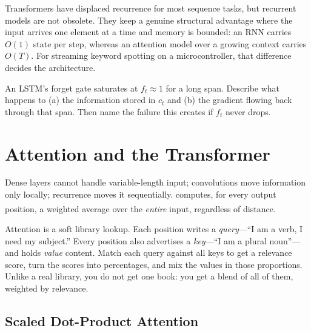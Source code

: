 \begin{engineernote}
Transformers have displaced recurrence for most sequence tasks, but recurrent
models are not obsolete. They keep a genuine structural advantage where the
input arrives one element at a time and memory is bounded: an RNN carries
$O(1)$ state per step, whereas an attention model over a growing context carries
$O(T)$. For streaming keyword spotting on a microcontroller, that difference
decides the architecture.
\end{engineernote}

\begin{checkpoint}
An LSTM's forget gate saturates at $f_t \approx 1$ for a long span. Describe
what happens to (a) the information stored in $c_t$ and (b) the gradient flowing
back through that span. Then name the failure this creates if $f_t$ never
drops.
\end{checkpoint}

\section{Attention and the Transformer}
\label{sec:dl-attention}

Dense layers cannot handle variable-length input; convolutions move information
only locally; recurrence moves it sequentially.  computes,
for every output position, a weighted average over the \emph{entire} input,
regardless of distance\textsuperscript{\cite[][p.~73]{fleuretLittleBookDeep}}.

\begin{plainlanguage}
Attention is a soft library lookup. Each position writes a \emph{query}---``I am
a verb, I need my subject.'' Every position also advertises a \emph{key}---``I am
a plural noun''---and holds \emph{value} content. Match each query against all
keys to get a relevance score, turn the scores into percentages, and mix the
values in those proportions. Unlike a real library, you do not get one book: you
get a blend of all of them, weighted by relevance.
\end{plainlanguage}

\subsection{Scaled Dot-Product Attention}

